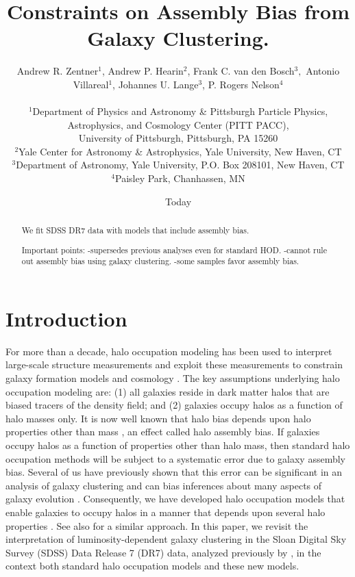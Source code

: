 \documentclass[usenatbib,usegraphicx,letterpaper]{mn2e}
\title[Clustering Constraints on Assembly Bias]
{
Constraints on Assembly Bias from Galaxy Clustering. 
}
\author[Zentner et al.]
{Andrew R. Zentner$^{1}$, Andrew P. Hearin$^{2}$, Frank C. van den Bosch$^{3},$ \newauthor
Antonio Villareal$^{1}$, Johannes U. Lange$^{3}$, P. Rogers Nelson$^{4}$\\ \\
$^1$Department of Physics and Astronomy \& Pittsburgh Particle Physics, Astrophysics, and Cosmology Center (PITT PACC),\\ University of Pittsburgh, Pittsburgh, PA 15260\\
$^2$Yale Center for Astronomy \& Astrophysics, Yale University, New Haven, CT\\
$^3$Department of Astronomy, Yale University, P.O. Box 208101, New Haven, CT\\
$^4$Paisley Park, Chanhassen, MN\\
}
\date{Today}
\begin{document}
\maketitle

\begin{abstract}

We fit SDSS DR7 data with models that include assembly bias.

Important points:
-supersedes previous analyses even for standard HOD.
-cannot rule out assembly bias using galaxy clustering.
-some samples favor assembly bias.

\end{abstract} 

\section{Introduction}
\label{section:introduction}

For more than a decade, halo occupation modeling has been used to
interpret large-scale structure measurements and exploit these
measurements to constrain galaxy formation models and cosmology
\citep[e.g.,][]{yang03,tinker05,zehavi05a,
  porciani06,vdBosch07,Zheng07,conroy_wechsler09,yang09b,zehavi_etal11,guo_etal11b,
  wake_etal11,yang11a,yang12,leauthaud_etal12,rod_puebla12,tinker_etal13,cacciato_etal13,
  more_etal13,guo_etal14,zu_mandelbaum15b}. The key assumptions
underlying halo occupation modeling are: (1) all galaxies reside in
dark matter halos that are biased tracers of the density field; and
(2) galaxies occupy halos as a function of halo masses only. It is now
well known that halo bias depends upon halo properties other than mass
\citep[e.g.][]{gao_etal05,wechsler06,gao_white07,zentner07,dalal_etal08,lacerna11},
an effect called halo assembly bias. If galaxies occupy halos as a
function of properties other than halo mass, then standard halo
occupation methods will be subject to a systematic error due to galaxy
assembly bias. Several of us have previously shown that this error can
be significant in an analysis of galaxy clustering and can bias
inferences about many aspects of galaxy evolution
\citep{zentner_etal14}. Consequently, we have developed halo
occupation models that enable galaxies to occupy halos in a manner
that depends upon several halo properties \citep{hearin_etal16}.  See
also \citet{Yao_etalXX} for a similar approach. In this paper, we
revisit the interpretation of luminosity-dependent galaxy clustering
in the Sloan Digital Sky Survey (SDSS) Data Release 7 (DR7) data,
analyzed previously by \citet{zehavi_etal11}, in the context both
standard halo occupation models and these new models.
\end{document}
